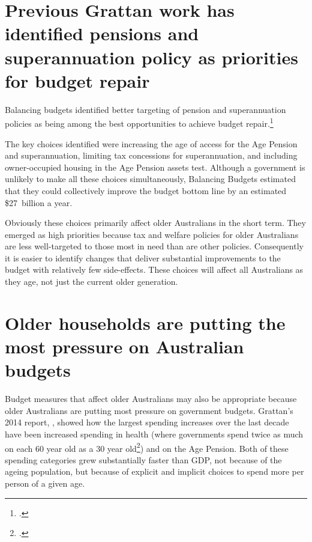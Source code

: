 \documentclass{grattanAlpha}
\begin{document}
\section{Previous Grattan work has identified pensions and superannuation policy as priorities for budget repair}\label{sec:SUPER-prev-grattan-work-identified-super}
Balancing budgets identified better targeting of pension and superannuation policies as being among the best opportunities to achieve budget repair.\footcite[][29]{DaleyMcGannonSavage2013BudgetPressures}

The key choices identified were increasing the age of access for the Age Pension and superannuation, limiting tax concessions for superannuation, and including owner-occupied housing in the Age Pension assets test. Although a government is unlikely to make all these choices simultaneously, Balancing Budgets estimated that they could collectively improve the budget bottom line by an estimated \$27~billion a year.

Obviously these choices primarily affect older Australians in the short term. They emerged as high priorities because tax and welfare policies for older Australians are less well-targeted to those most in need than are other policies. Consequently it is easier to identify changes that deliver substantial improvements to the budget with relatively few side-effects. These choices will affect all Australians as they age, not just the current older generation. 

\section{Older households are putting the most pressure on Australian budgets}
Budget measures that affect older Australians may also be appropriate because older Australians are putting most pressure on government budgets. Grattan’s 2014 report, , showed how the largest spending increases over the last decade have been increased spending in health (where governments spend twice as much on each 60 year old as a 30 year old\footcite[][25]{DaleyMcGannonHunter2014}) and on the Age Pension. Both of these spending categories grew substantially faster than GDP, not because of the ageing population, but because of explicit and implicit choices to spend more per person of a given age.
\end{document}
